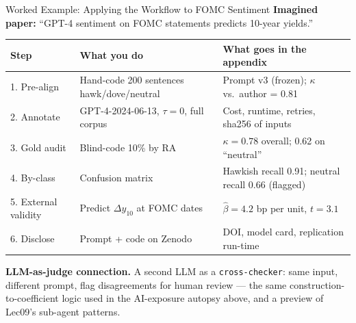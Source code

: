 \begin{frame}{Worked Example: Applying the Workflow to FOMC Sentiment}
\textbf{Imagined paper:} ``GPT-4 sentiment on FOMC statements predicts 10-year yields.''

\medskip
\begin{center}
\renewcommand{\arraystretch}{1.2}
\footnotesize
\begin{tabular}{|p{2.4cm}|p{4.0cm}|p{6.6cm}|}
\hline
\textbf{Step} & \textbf{What you do} & \textbf{What goes in the appendix} \\ \hline
1. Pre-align & Hand-code 200 sentences hawk/dove/neutral & Prompt v3 (frozen); $\kappa$ vs.\ author = 0.81 \\ \hline
2. Annotate & GPT-4-2024-06-13, $\tau=0$, full corpus & Cost, runtime, retries, sha256 of inputs \\ \hline
3. Gold audit & Blind-code 10\% by RA & $\kappa = 0.78$ overall; 0.62 on ``neutral'' \\ \hline
4. By-class & Confusion matrix & Hawkish recall 0.91; neutral recall 0.66 (flagged) \\ \hline
5. External validity & Predict $\Delta y_{10}$ at FOMC dates & $\hat\beta = 4.2$ bp per unit, $t = 3.1$ \\ \hline
6. Disclose & Prompt + code on Zenodo & DOI, model card, replication run-time \\ \hline
\end{tabular}
\end{center}

\medskip
\textbf{LLM-as-judge connection.} A second LLM as a \texttt{cross-checker}: same input, different prompt, flag disagreements for human review --- the same construction-to-coefficient logic used in the AI-exposure autopsy above, and a preview of Lec09's sub-agent patterns.
\end{frame}

